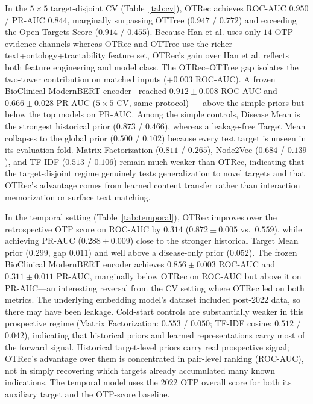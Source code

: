 \documentclass{article}
\begin{document}
In the $5{\times}5$ target-disjoint CV (Table~\ref{tab:cv}), OTRec
achieves ROC-AUC $0.950$ / PR-AUC $0.844$, marginally surpassing
OTTree ($0.947$ / $0.772$) and exceeding the Open Targets
Score ($0.914$ / $0.455$).
Because Han et al. uses only $14$ OTP evidence channels whereas OTRec
and OTTree use the richer text+ontology+tractability feature set,
OTRec's gain over Han et al. reflects both feature engineering and model
class. The OTRec--OTTree gap isolates the two-tower contribution on
matched inputs ($+0.003$ ROC-AUC).
A frozen BioClinical ModernBERT encoder~\citep{sounack2025bioclinicalmodernbert} reached
$0.912 \pm 0.008$ ROC-AUC and $0.666 \pm 0.028$ PR-AUC ($5{\times}5$ CV, same protocol) --- above the simple priors but below the top models on PR-AUC.
Among the simple controls, Disease Mean is the strongest
historical prior ($0.873$ / $0.466$), whereas a leakage-free Target
Mean collapses to the global prior ($0.500$ / $0.102$) because every
test target is unseen in its evaluation fold. Matrix Factorization
($0.811$ / $0.265$), Node2Vec ($0.684$ / $0.139$), and TF-IDF ($0.513$ / $0.106$) remain much weaker
than OTRec, indicating that the target-disjoint regime genuinely tests
generalization to novel targets and that OTRec's advantage comes from
learned content transfer rather than interaction memorization or surface text matching.

In the temporal setting (Table~\ref{tab:temporal}), OTRec improves over
the retrospective OTP score on ROC-AUC by $0.314$
($0.872 \pm 0.005$ vs.\ $0.559$), while achieving PR-AUC
($0.288 \pm 0.009$) close to the stronger historical Target Mean prior
($0.299$, gap $0.011$) and well above a disease-only prior ($0.052$).
The frozen BioClinical ModernBERT encoder achieves $0.856 \pm 0.003$ ROC-AUC and
$0.311 \pm 0.011$ PR-AUC, marginally below OTRec on ROC-AUC but above it
on PR-AUC---an interesting reversal from the CV setting where OTRec led on
both metrics. The underlying embedding model's dataset included post-2022 data, so there may have been leakage.
Cold-start controls are substantially weaker in this prospective
regime (Matrix Factorization: $0.553$ / $0.050$; TF-IDF cosine:
$0.512$ / $0.042$), indicating that historical priors and learned
representations carry most of the forward signal.
Historical target-level priors carry real prospective signal; OTRec's
advantage over them is concentrated in pair-level ranking (ROC-AUC),
not in simply recovering which targets already accumulated many known
indications.
The temporal model uses the 2022 OTP overall score for both its
auxiliary target and the OTP-score baseline.
\end{document}
